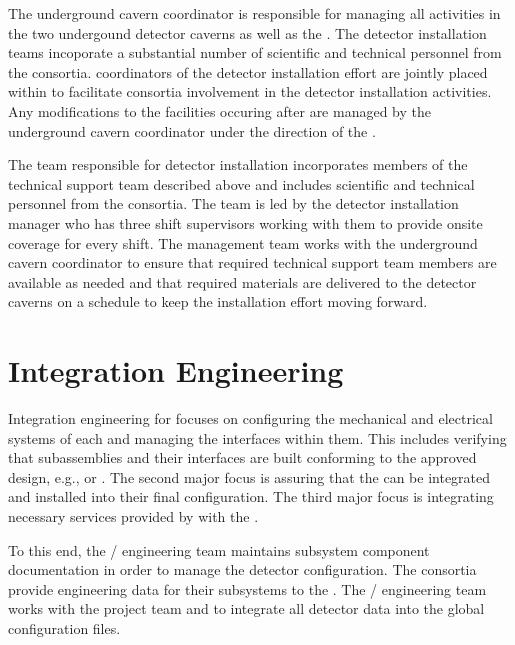 The underground cavern coordinator is responsible for managing all 
activities in the two undergound detector caverns as well as the
. The detector
installation teams incoporate a substantial number of scientific and
technical personnel from the  consortia.   coordinators 
of the detector installation effort are jointly placed within 
  to facilitate consortia involvement in the 
detector installation activities.  Any modifications to the facilities 
occuring after  are managed by the underground cavern 
coordinator under the direction of the .

The team responsible for detector installation incorporates 
members of the technical support team described above 
and includes scientific and technical personnel from 
the  consortia.  The team is led by the detector
installation manager who has three shift supervisors working 
with them to provide onsite coverage for every shift.
The management team works with the underground cavern
coordinator to ensure that required technical support team 
members are available as needed and that required materials 
are delivered to the detector caverns on a schedule to keep
the installation effort moving forward.   

\section{Integration Engineering}
\label{sec:es-coord-integ-sysengr}

Integration engineering for  focuses on configuring the
mechanical and electrical systems of each  and managing
the interfaces within them. This includes verifying that subassemblies
and their interfaces are built conforming to the approved design,
e.g.,  or . The second major focus
is assuring that the  can be integrated and
installed into their final configuration. The third major focus is
integrating necessary services provided by  
with the .

To this end, the / engineering team maintains
subsystem component documentation in order to manage the detector
configuration. The consortia provide engineering data for their
subsystems to the . The / engineering team
works with the  project team and  to integrate
all detector data into the global  configuration files.



